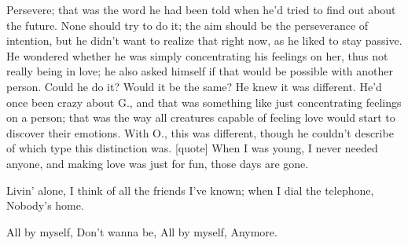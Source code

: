 Persevere; that was the word he had been told when he'd tried to find out about the future. 
None should try to do it; the aim should be the perseverance of intention, but he didn't want to realize that right now, as he liked to stay passive. 
He wondered whether he was simply concentrating his feelings on her, thus not really being in love; he also asked himself if that would be possible with another person. Could he do it? Would it be the same?
He knew it was different. He'd once been crazy about G., and that was something like just concentrating feelings on a person; that was the way all creatures capable of feeling love would start to discover their emotions. With O., this was different, though he couldn't describe of which type this distinction was. 
[quote]
When I was young,
I never needed anyone,
and making love was just for fun,
those days are gone. 

Livin' alone,
I think of all the friends I've known;
when I dial the telephone,
Nobody's home. 

All by myself,
Don't wanna be,
All by myself,
Anymore. 

